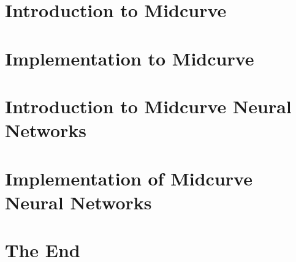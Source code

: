 \section[Intro]{Introduction to Midcurve}


\section[Impl]{Implementation to Midcurve}


\section[NN]{Introduction to Midcurve Neural Networks}


\section[NNIMPL]{Implementation of Midcurve Neural Networks}


\section[End]{The End}

